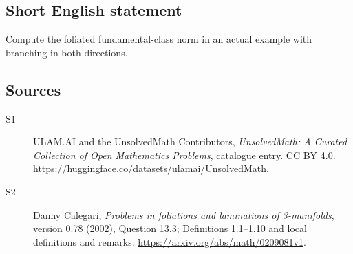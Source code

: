 \documentclass[11pt]{article}
\begin{document}
\subsection{Short English statement}
Compute the foliated fundamental-class norm in an actual example with branching in both directions.
\subsection{Sources}
\begin{description}
\item[\hypertarget{source:statement:1}{S1}] ULAM.AI and the UnsolvedMath Contributors, \emph{UnsolvedMath: A Curated Collection of Open Mathematics Problems}, catalogue entry. CC BY 4.0. \url{https://huggingface.co/datasets/ulamai/UnsolvedMath}.
\item[\hypertarget{source:statement:2}{S2}] Danny Calegari, \emph{Problems in foliations and laminations of 3-manifolds}, version 0.78 (2002), Question 13.3; Definitions 1.1--1.10 and local definitions and remarks. \url{https://arxiv.org/abs/math/0209081v1}.
\end{description}
\label{end:statement}
\end{document}
